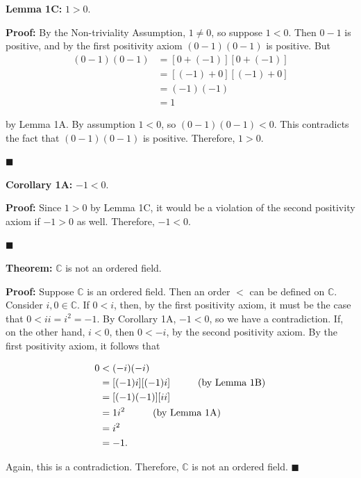 \documentclass[12pt]{article}
\begin{document}
\noindent\textbf{Lemma 1C:} $1>0$.

\noindent\textbf{Proof:} By the Non-triviality Assumption, $1\neq 0$, so suppose $1<0$. Then $0-1$ is positive, and by the first positivity axiom $(0-1)(0-1)$ is positive.  But
\begin{align}
(0-1)(0-1) &= [0+(-1)][0+(-1)] \\
&= [(-1)+0][(-1)+0] \\
&= (-1)(-1) \\
&= 1
\end{align}

\noindent by Lemma 1A. By assumption $1<0$, so $(0-1)(0-1)<0$. This contradicts the fact that $(0-1)(0-1)$ is positive. Therefore, $1>0$. 

\hfill$\blacksquare$

\vspace{5mm}
\noindent\textbf{Corollary 1A:} $-1 < 0.$

\noindent\textbf{Proof:} Since $1 > 0$ by Lemma 1C, it would be a violation of the second positivity axiom if $-1 > 0$ as well. Therefore, $-1 < 0.$

\hfill$\blacksquare$

\vspace{5mm}

\noindent\textbf{Theorem:} $\mathbb{C}$ is not an ordered field.

\noindent\textbf{Proof:} Suppose $\mathbb{C}$ is an ordered field. Then an order $<$ can be defined on $\mathbb{C}$. Consider $i,0\in\mathbb{C}$. If $0<i$, then, by the first positivity axiom, it must be the case that $0<ii = i^2 = -1$. By Corollary 1A, $-1<0$, so we have a contradiction. If, on the other hand, $i<0$, then $0<-i$, by the second positivity axiom. By the first positivity axiom, it follows that 

\begin{align*}
0 &< (-i)(-i) \\
&= [(-1)i][(-1)i] \hspace{10mm} \text{(by Lemma 1B)} \\
&= [(-1)(-1)][ii] \\
&= 1i^2 \hspace{10mm} \text{(by Lemma 1A)} \\
&= i^2 \\
&= -1.
\end{align*}

\noindent Again, this is a contradiction. Therefore, $\mathbb{C}$ is not an ordered field. 
\hfill$\blacksquare$
\end{document}
